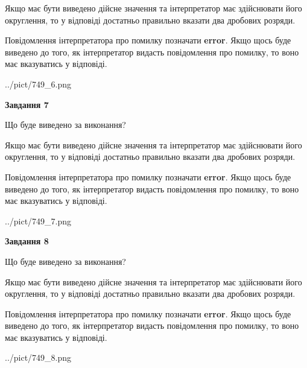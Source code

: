 \documentclass[12pt, ukrainian]{article}
\begin{document}
{\begin {Large}
Якщо має бути виведено дійсне значення та інтерпретатор має здійснювати його округлення, 
то у відповіді достатньо правильно вказати два дробових розряди.

Повідомлення інтерпретатора про помилку позначати \textbf{error}.
Якщо щось буде виведено до того, як інтерпретатор видасть повідомлення про помилку, 
то воно має вказуватись у відповіді. \par

\begin{center}
	{../pict/749_6.png}
\end{center}
\newpage

{\begin {center}\textbf{Завдання 7}\end {center}}\par
Що буде виведено за виконання? \par

Якщо має бути виведено дійсне значення та інтерпретатор має здійснювати його округлення, 
то у відповіді достатньо правильно вказати два дробових розряди.

Повідомлення інтерпретатора про помилку позначати \textbf{error}.
Якщо щось буде виведено до того, як інтерпретатор видасть повідомлення про помилку, 
то воно має вказуватись у відповіді. \par

\begin{center}
	{../pict/749_7.png}
\end{center}
\newpage

{\begin {center}\textbf{Завдання 8}\end {center}}\par
Що буде виведено за виконання? \par

Якщо має бути виведено дійсне значення та інтерпретатор має здійснювати його округлення, 
то у відповіді достатньо правильно вказати два дробових розряди.

Повідомлення інтерпретатора про помилку позначати \textbf{error}.
Якщо щось буде виведено до того, як інтерпретатор видасть повідомлення про помилку, 
то воно має вказуватись у відповіді. \par

\begin{center}
	{../pict/749_8.png}
\end{center}
\newpage


\end{Large}}
\end{document}
